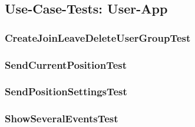 \subsection{Use-Case-Tests: User-App}
\subsubsection{CreateJoinLeaveDeleteUserGroupTest}

\subsubsection{SendCurrentPositionTest}

\subsubsection{SendPositionSettingsTest}

\subsubsection{ShowSeveralEventsTest}
